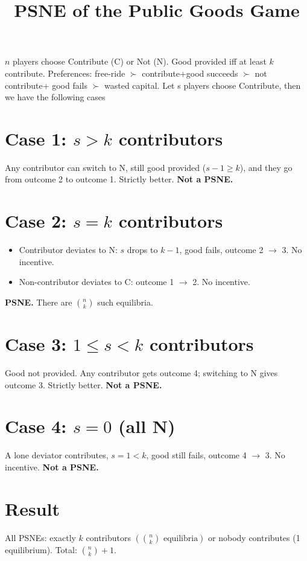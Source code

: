 \documentclass{article}
\title{PSNE of the Public Goods Game}
\author{}
\date{}
\begin{document}
\maketitle

\noindent $n$ players choose Contribute (C) or Not (N). Good provided iff at least $k$ contribute.
\newline Preferences: free-ride $\succ$ contribute+good succeeds $\succ$ not contribute+ good fails $\succ$ wasted capital.
\newline
\newline Let s players choose Contribute, then we have the following cases

\section*{Case 1: $s > k$ contributors}

Any contributor can switch to N, still good provided ($s-1 \geq k$), and they go from outcome 2 to outcome 1. Strictly better. \textbf{Not a PSNE.}

\section*{Case 2: $s = k$ contributors}

\begin{itemize}
  \item Contributor deviates to N: $s$ drops to $k-1$, good fails, outcome 2 $\to$ 3. No incentive.
  \item Non-contributor deviates to C: outcome 1 $\to$ 2. No incentive.
\end{itemize}

\textbf{PSNE.} There are $\binom{n}{k}$ such equilibria.

\section*{Case 3: $1 \leq s < k$ contributors}

Good not provided. Any contributor gets outcome 4; switching to N gives outcome 3. Strictly better.
\newline \textbf{Not a PSNE.}

\section*{Case 4: $s = 0$ (all N)}

A lone deviator contributes, $s=1 < k$, good still fails, outcome 4 $\to$ 3. No incentive. \textbf{Not a PSNE.}

\section*{Result}

All PSNEs: exactly $k$ contributors $\left(\binom{n}{k} \text{ equilibria}\right)$ or nobody contributes (1 equilibrium). Total: $\binom{n}{k} + 1$.
\end{document}
